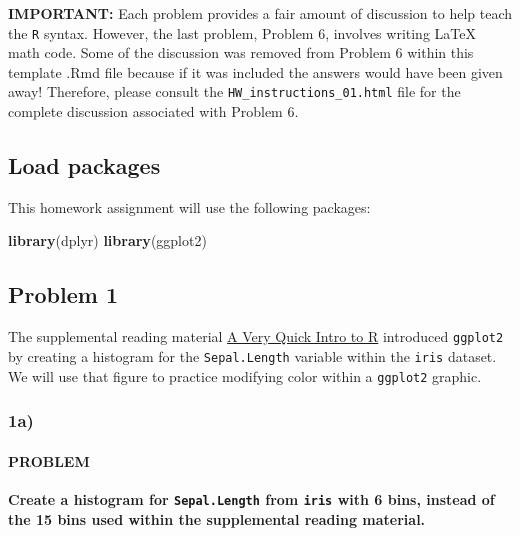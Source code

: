 \documentclass[]{article}
\newenvironment{Shaded}{\begin{snugshade}}{\end{snugshade}}
\newcommand{\KeywordTok}[1]{\textcolor[rgb]{0.13,0.29,0.53}{\textbf{#1}}}
\newcommand{\NormalTok}[1]{#1}
\let\oldparagraph\paragraph
\renewcommand{\paragraph}[1]{\oldparagraph{#1}\mbox{}}
\begin{document}
\textbf{IMPORTANT:} Each problem provides a fair amount of discussion to
help teach the \texttt{R} syntax. However, the last problem, Problem 6,
involves writing LaTeX math code. Some of the discussion was removed
from Problem 6 within this template .Rmd file because if it was included
the answers would have been given away! Therefore, please consult the
\texttt{HW\_instructions\_01.html} file for the complete discussion
associated with Problem 6.

\hypertarget{load-packages}{%
\subsection{Load packages}\label{load-packages}}

This homework assignment will use the following packages:

\begin{Shaded}
\begin{Highlighting}[]
\KeywordTok{library}\NormalTok{(dplyr)}
\KeywordTok{library}\NormalTok{(ggplot2)}
\end{Highlighting}
\end{Shaded}

\hypertarget{problem-1}{%
\subsection{Problem 1}\label{problem-1}}

The supplemental reading material
\href{https://github.com/jyurko/CS_1675_Spring_2020/blob/master/week_01/quick_r_intro.md}{A
Very Quick Intro to R} introduced \texttt{ggplot2} by creating a
histogram for the \texttt{Sepal.Length} variable within the
\texttt{iris} dataset. We will use that figure to practice modifying
color within a \texttt{ggplot2} graphic.

\hypertarget{a}{%
\subsubsection{1a)}\label{a}}

\hypertarget{problem}{%
\paragraph{PROBLEM}\label{problem}}

\textbf{Create a histogram for \texttt{Sepal.Length} from \texttt{iris}
with 6 bins, instead of the 15 bins used within the supplemental reading
material.}
\end{document}
